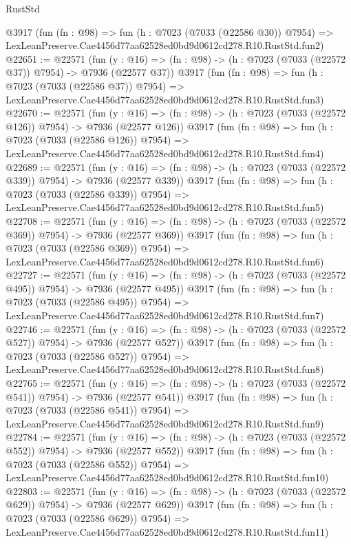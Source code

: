 \begin{lexlean}{RustStd}
\begin{coremodule}
    @3917
    (fun (fn : @98) =>
    fun (h : @7023 (@7033 (@22586 @30)) @7954) =>
    LexLeanPreserve.Cae4456d77aa62528ed0bd9d0612cd278.R10.RustStd.fun2)
@22651 := @22571
    (fun (y : @16) => (fn : @98) -> (h : @7023 (@7033 (@22572 @37)) @7954) -> @7936 (@22577 @37))
    @3917
    (fun (fn : @98) =>
    fun (h : @7023 (@7033 (@22586 @37)) @7954) =>
    LexLeanPreserve.Cae4456d77aa62528ed0bd9d0612cd278.R10.RustStd.fun3)
@22670 := @22571
    (fun (y : @16) => (fn : @98) -> (h : @7023 (@7033 (@22572 @126)) @7954) -> @7936 (@22577 @126))
    @3917
    (fun (fn : @98) =>
    fun (h : @7023 (@7033 (@22586 @126)) @7954) =>
    LexLeanPreserve.Cae4456d77aa62528ed0bd9d0612cd278.R10.RustStd.fun4)
@22689 := @22571
    (fun (y : @16) => (fn : @98) -> (h : @7023 (@7033 (@22572 @339)) @7954) -> @7936 (@22577 @339))
    @3917
    (fun (fn : @98) =>
    fun (h : @7023 (@7033 (@22586 @339)) @7954) =>
    LexLeanPreserve.Cae4456d77aa62528ed0bd9d0612cd278.R10.RustStd.fun5)
@22708 := @22571
    (fun (y : @16) => (fn : @98) -> (h : @7023 (@7033 (@22572 @369)) @7954) -> @7936 (@22577 @369))
    @3917
    (fun (fn : @98) =>
    fun (h : @7023 (@7033 (@22586 @369)) @7954) =>
    LexLeanPreserve.Cae4456d77aa62528ed0bd9d0612cd278.R10.RustStd.fun6)
@22727 := @22571
    (fun (y : @16) => (fn : @98) -> (h : @7023 (@7033 (@22572 @495)) @7954) -> @7936 (@22577 @495))
    @3917
    (fun (fn : @98) =>
    fun (h : @7023 (@7033 (@22586 @495)) @7954) =>
    LexLeanPreserve.Cae4456d77aa62528ed0bd9d0612cd278.R10.RustStd.fun7)
@22746 := @22571
    (fun (y : @16) => (fn : @98) -> (h : @7023 (@7033 (@22572 @527)) @7954) -> @7936 (@22577 @527))
    @3917
    (fun (fn : @98) =>
    fun (h : @7023 (@7033 (@22586 @527)) @7954) =>
    LexLeanPreserve.Cae4456d77aa62528ed0bd9d0612cd278.R10.RustStd.fun8)
@22765 := @22571
    (fun (y : @16) => (fn : @98) -> (h : @7023 (@7033 (@22572 @541)) @7954) -> @7936 (@22577 @541))
    @3917
    (fun (fn : @98) =>
    fun (h : @7023 (@7033 (@22586 @541)) @7954) =>
    LexLeanPreserve.Cae4456d77aa62528ed0bd9d0612cd278.R10.RustStd.fun9)
@22784 := @22571
    (fun (y : @16) => (fn : @98) -> (h : @7023 (@7033 (@22572 @552)) @7954) -> @7936 (@22577 @552))
    @3917
    (fun (fn : @98) =>
    fun (h : @7023 (@7033 (@22586 @552)) @7954) =>
    LexLeanPreserve.Cae4456d77aa62528ed0bd9d0612cd278.R10.RustStd.fun10)
@22803 := @22571
    (fun (y : @16) => (fn : @98) -> (h : @7023 (@7033 (@22572 @629)) @7954) -> @7936 (@22577 @629))
    @3917
    (fun (fn : @98) =>
    fun (h : @7023 (@7033 (@22586 @629)) @7954) =>
    LexLeanPreserve.Cae4456d77aa62528ed0bd9d0612cd278.R10.RustStd.fun11)

\end{coremodule}
\end{lexlean}
